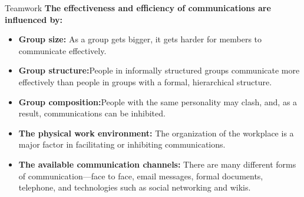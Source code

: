 \documentclass{beamer}
\begin{document}
\begin{frame}{Teamwork}
	\textbf{The effectiveness and efficiency of communications are influenced by:}
	\begin{itemize}
		\item \textbf{Group size:} As a group gets bigger, it gets harder for members to communicate effectively. 
		\item \textbf{Group structure:}People in informally structured groups communicate 
		more effectively than people in groups with a formal, hierarchical structure.
		\item \textbf{Group composition:}People with the same personality may clash, and, as 
		a result, communications can be inhibited.
			\item \textbf{The physical work environment:} The organization of the workplace is a 
				major factor in facilitating or inhibiting communications.
		\item \textbf{The available communication channels:} There are many different forms 
			of communication—face to face, email messages, formal documents, 
			telephone, and technologies such as social networking and wikis.
	\end{itemize}
\end{frame}
\end{document}
